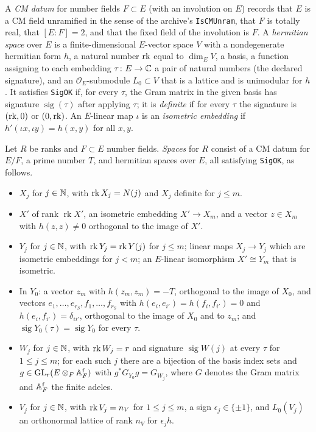\begin{definition}\label{geoa:hspace}
A \emph{CM datum} for number fields $F\subset E$ (with an involution on $E$) records that
$E$ is a CM field unramified in the sense of the archive's \texttt{IsCMUnram}, that $F$ is
totally real, that $[E:F]=2$, and that the fixed field of the involution is $F$.
A \emph{hermitian space} over $E$ is a finite-dimensional $E$-vector space $V$ with a
nondegenerate hermitian form $h$, a natural number $\operatorname{rk}$ equal to $\dim_EV$, a basis,
a function assigning to each embedding $\tau\colon E\to\mathbb{C}$ a pair of natural numbers
(the declared signature), and an $\mathcal O_E$-submodule $L_0\subset V$ that is a
lattice and is unimodular for $h$. It satisfies \texttt{SigOK} if, for every $\tau$, the
Gram matrix in the given basis has signature $\operatorname{sig}(\tau)$ after applying
$\tau$; it is \emph{definite} if for every $\tau$ the signature is $(\operatorname{rk},0)$ or
$(0,\operatorname{rk})$. An $E$-linear map $\iota$ is an \emph{isometric embedding} if
$h'(\iota x,\iota y)=h(x,y)$ for all $x,y$.
\end{definition}

\begin{definition}\label{geoa:spaces}
Let $R$ be ranks and $F\subset E$ number fields. \emph{Spaces} for $R$ consist of a CM
datum for $E/F$, a prime number $T$, and hermitian spaces over $E$, all satisfying
\texttt{SigOK}, as follows.
\begin{itemize}
\item $X_j$ for $j\in\mathbb{N}$, with $\operatorname{rk} X_j=N(j)$ and $X_j$ definite for $j\le m$.
\item $X'$ of rank $\operatorname{rk}X'$, an isometric embedding $X'\to X_m$, and a
vector $z\in X_m$ with $h(z,z)\ne0$ orthogonal to the image of $X'$.
\item $Y_j$ for $j\in\mathbb{N}$, with $\operatorname{rk} Y_j=\operatorname{rk}Y(j)$ for $j\le m$; linear maps
$X_j\to Y_j$ which are isometric embeddings for $j<m$; an $E$-linear isomorphism
$X'\cong Y_m$ that is isometric.
\item In $Y_0$: a vector $z_m$ with $h(z_m,z_m)=-T$, orthogonal to the image of $X_0$, and
vectors $e_1,\dots,e_{r_S},f_1,\dots,f_{r_S}$ with $h(e_i,e_{i'})=h(f_i,f_{i'})=0$ and
$h(e_i,f_{i'})=\delta_{ii'}$, orthogonal to the image of $X_0$ and to $z_m$; and
$\operatorname{sig}Y_0(\tau)=\operatorname{sig}Y_0$ for every $\tau$.
\item $W_j$ for $j\in\mathbb{N}$, with $\operatorname{rk} W_j=r$ and signature $\operatorname{sig}W(j)$ at
every $\tau$ for $1\le j\le m$; for each such $j$ there are a bijection of the basis
index sets and $g\in\mathrm{GL}_r(E\otimes_F\mathbb{A}_F^{\mathrm f})$ with $g^*G_{Y_0}g=G_{W_j}$, where
$G$ denotes the Gram matrix and $\mathbb{A}_F^{\mathrm f}$ the finite adeles.
\item $V_j$ for $j\in\mathbb{N}$, with $\operatorname{rk} V_j=n_V$ for $1\le j\le m$, a sign
$\epsilon_j\in\{\pm1\}$, and $L_0(V_j)$ an orthonormal lattice of rank $n_V$ for
$\epsilon_jh$.
\end{itemize}
\end{definition}

